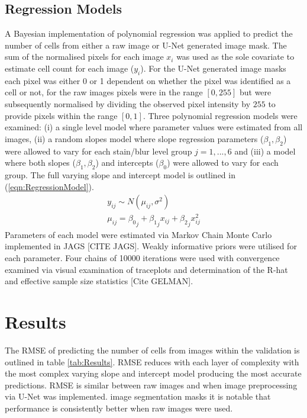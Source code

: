 \documentclass[isoft]{poster_class_UofC}
\begin{document}
\begin{poster}
        \subsection{Regression Models}      
     A Bayesian implementation of polynomial regression was applied to predict the number of cells from either a raw image or U-Net generated image mask.  The sum of the normalised pixels for each image $x_i$ was used as the sole covariate to estimate cell count for each image ($y_i$).   For the U-Net generated image masks each pixel was either 0 or 1 dependent on whether the pixel was identified as a cell or not, for the raw images pixels were in the range $[0,255]$ but were subsequently normalised by dividing the observed pixel intensity by $255$ to provide pixels within the range $[0,1]$.  
     Three polynomial regression models were examined: (i) a single level model where parameter values were estimated from all images, (ii) a random slopes model where slope regression parameters ($\beta_1, \beta_2$) were allowed to vary for each stain/blur level group $j = 1, ..., 6$ and (iii) a model where both slopes ($\beta_1, \beta_2$) and intercepts ($\beta_0$) were allowed to vary for each group.  The full varying slope and intercept model is outlined in  (\ref{eqn:RegressionModel}).
\begin{align}
y_{ij} \sim N(\mu_{ij}, \sigma^2) \nonumber\\
\mu_{ij} = {\beta_0}_{j} + {\beta_1}_{j} x_{ij} + {\beta_2}_{j} x_{ij}^2 \label{eqn:RegressionModel}
\end{align}     
     Parameters of each model were estimated via Markov Chain Monte Carlo implemented in JAGS [CITE JAGS]. Weakly informative priors were utilised for each parameter. Four chains of 10000 iterations were used with convergence examined via visual examination of traceplots and determination of the R-hat and effective sample size statistics [Cite GELMAN].     
        
        \section{Results}%
The RMSE of predicting the number of cells from images within the validation is outlined in table \ref{tab:Results}.  RMSE reduces with each layer of complexity with the most complex varying slope and intercept model producing the most accurate predictions.  RMSE is similar between raw images and when image preprocessing via U-Net was implemented. image segmentation masks it is notable that performance is consistently better when raw images were used.  
        

\end{poster}
\end{document}
